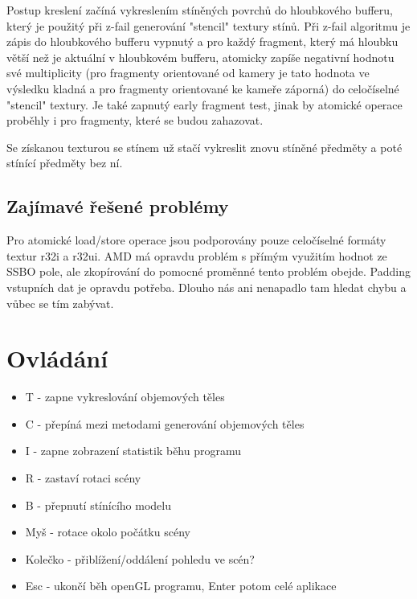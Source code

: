 \documentclass[a4paper, 12pt]{article}
\begin{document}
Postup kreslení začíná vykreslením stíněných povrchů do hloubkového bufferu, který je použitý při 
z-fail generování "stencil" textury stínů. Při z-fail algoritmu je zápis do hloubkového bufferu vypnutý
a pro každý fragment, který má hloubku větší než je aktuální v hloubkovém bufferu, atomicky zapíše negativní
hodnotu své multiplicity (pro fragmenty orientované od kamery je tato hodnota ve výsledku kladná a pro
fragmenty orientované ke kameře záporná) do celočíselné "stencil" textury. Je také zapnutý early fragment test,
jinak by atomické operace proběhly i pro fragmenty, které se budou zahazovat.

Se získanou texturou se stínem už stačí vykreslit znovu stíněné předměty a poté stínící předměty bez ní.

\subsection{Zajímavé řešené problémy}
Pro atomické load/store operace jsou podporovány pouze celočíselné formáty textur r32i a r32ui.
AMD má opravdu problém s přímým využitím hodnot ze SSBO pole, ale zkopírování do pomocné proměnné tento problém obejde.
Padding vstupních dat je opravdu potřeba. Dlouho nás ani nenapadlo tam hledat chybu a vůbec se tím zabývat. 


\section{Ovládání}

\begin{itemize}
	\item T - zapne vykreslování objemových těles
	\item C - přepíná mezi metodami generování objemových těles
	\item I - zapne zobrazení statistik běhu programu
	\item R - zastaví rotaci scény
	\item B - přepnutí stínícího modelu
	\item Myš - rotace okolo počátku scény
	\item Kolečko - přiblížení/oddálení pohledu ve scén?
	\item Esc - ukončí běh openGL programu, Enter potom celé aplikace
\end{itemize}

\end{document}

